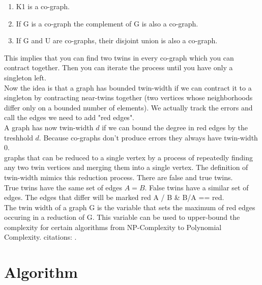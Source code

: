 \documentclass[10pt]{article}
\begin{document}
\begin{enumerate}
    \item K1 is a co-graph.
    \item If G is a co-graph the complement of G is also a co-graph.
    \item If G and U are co-graphs, their disjoint union is also a co-graph.
\end{enumerate}

This implies that you can find two twins in every co-graph which you can contract together. Then you can iterate the process until you have only a singleton left.\\
Now the idea is that a graph has bounded twin-width if we can contract it to a singleton
by contracting near-twins together (two vertices whose neighborhoods differ only on a
bounded number of elements). We actually track the errors and call the edges we need to
add "red edges".\\
A graph has now twin-width $d$ if we can bound the degree in red edges by the treshhold $d$.
Because co-graphs don't produce errors they always have twin-width 0. \\

graphs that can be reduced to a single vertex by a process of repeatedly finding any two
twin vertices and merging them into a single vertex.  The definition of twin-width mimics
this reduction process. There are false and true twins.\\
True twins have the same set of edges $A = B$. False twins have a similar set of edges. The
edges that differ will be marked red {A / B \& B/A} == red. \\

The twin width of a graph G is the variable that sets the maximum of red edges occuring in a
reduction of G. This variable can be used to upper-bound the complexity for
certain algorithms from NP-Complexity to Polynomial Complexity. citations:
\cite{bonnet2021twini} \cite{bonnet2021twinii}.

\section{Algorithm}
\end{document}
